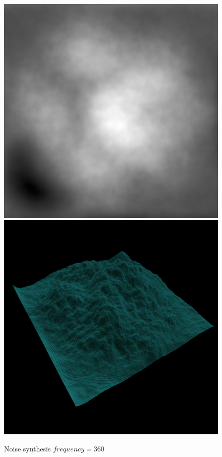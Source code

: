 \begin{figure}[H]
	  \\[0.25em]
	  \includegraphics[width=\imagewidth]{images/results/terrains/512-1/simplex/360}
	  \includegraphics[width=\imagewidth]{images/results/terrains/512-1/simplex/360_3d}
	  \caption{Noise synthesis $frequency = 360$}
	  \label{fig:ex-noise360-surface}
	\end{figure}
	  
